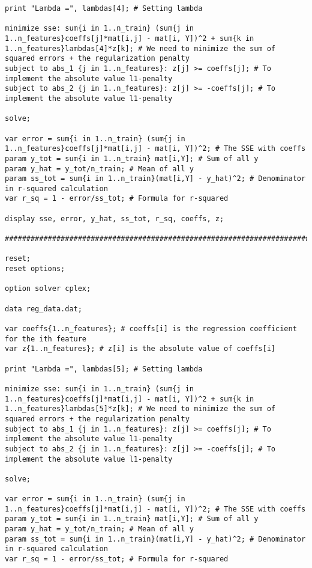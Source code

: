 \documentclass[15pt,a4paper,openright]{article}
\begin{document}
\begin{lstlisting}[language=AMPL, caption=1c Code]
print "Lambda =", lambdas[4]; # Setting lambda

minimize sse: sum{i in 1..n_train} (sum{j in 1..n_features}coeffs[j]*mat[i,j] - mat[i, Y])^2 + sum{k in 1..n_features}lambdas[4]*z[k]; # We need to minimize the sum of squared errors + the regularization penalty
subject to abs_1 {j in 1..n_features}: z[j] >= coeffs[j]; # To implement the absolute value l1-penalty
subject to abs_2 {j in 1..n_features}: z[j] >= -coeffs[j]; # To implement the absolute value l1-penalty

solve;

var error = sum{i in 1..n_train} (sum{j in 1..n_features}coeffs[j]*mat[i,j] - mat[i, Y])^2; # The SSE with coeffs
param y_tot = sum{i in 1..n_train} mat[i,Y]; # Sum of all y
param y_hat = y_tot/n_train; # Mean of all y
param ss_tot = sum{i in 1..n_train}(mat[i,Y] - y_hat)^2; # Denominator in r-squared calculation
var r_sq = 1 - error/ss_tot; # Formula for r-squared

display sse, error, y_hat, ss_tot, r_sq, coeffs, z;

#############################################################################

reset;
reset options;

option solver cplex;

data reg_data.dat;

var coeffs{1..n_features}; # coeffs[i] is the regression coefficient for the ith feature
var z{1..n_features}; # z[i] is the absolute value of coeffs[i]

print "Lambda =", lambdas[5]; # Setting lambda

minimize sse: sum{i in 1..n_train} (sum{j in 1..n_features}coeffs[j]*mat[i,j] - mat[i, Y])^2 + sum{k in 1..n_features}lambdas[5]*z[k]; # We need to minimize the sum of squared errors + the regularization penalty
subject to abs_1 {j in 1..n_features}: z[j] >= coeffs[j]; # To implement the absolute value l1-penalty
subject to abs_2 {j in 1..n_features}: z[j] >= -coeffs[j]; # To implement the absolute value l1-penalty

solve;

var error = sum{i in 1..n_train} (sum{j in 1..n_features}coeffs[j]*mat[i,j] - mat[i, Y])^2; # The SSE with coeffs
param y_tot = sum{i in 1..n_train} mat[i,Y]; # Sum of all y
param y_hat = y_tot/n_train; # Mean of all y
param ss_tot = sum{i in 1..n_train}(mat[i,Y] - y_hat)^2; # Denominator in r-squared calculation
var r_sq = 1 - error/ss_tot; # Formula for r-squared


\end{lstlisting}
\end{document}

